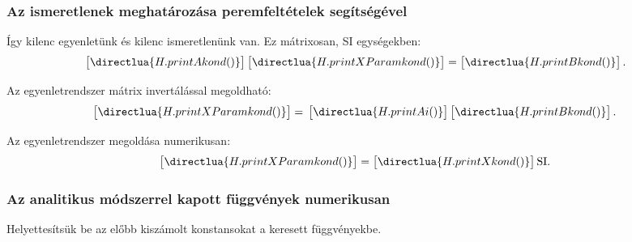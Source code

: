 \subsubsection{Az ismeretlenek meghatározása peremfeltételek segítségével}



Így kilenc egyenletünk és kilenc ismeretlenünk van. Ez mátrixosan,
SI egységekben:
\scriptsize
\begin{equation}
  \bgroup
  \sifigures{2}
  \sisci{}
  \begin{bmatrix}
    \directlua{H.printAkond()}
  \end{bmatrix}
  \egroup
  \begin{bmatrix}
    \directlua{H.printXParamkond()}
  \end{bmatrix}
  =
  \siplaces{3}
  \begin{bmatrix}
    \directlua{H.printBkond()}
  \end{bmatrix}
  \text.
  \label{eq:alma}
\end{equation}
\normalsize

Az egyenletrendszer mátrix invertálással megoldható:
\scriptsize
\begin{equation}
  \begin{bmatrix}
    \directlua{H.printXParamkond()}
  \end{bmatrix}
  =
  \bgroup
  \sifigures{2}
  \sisci{}
  \begin{bmatrix}
    \directlua{H.printAi()}
  \end{bmatrix}
  \egroup
  \siplaces{3}
  \begin{bmatrix}
    \directlua{H.printBkond()}
  \end{bmatrix}
  \label{eq:alma-inverted}
  \text.
\end{equation}
\normalsize

Az egyenletrendszer megoldása numerikusan:
\begin{equation}
  \begin{bmatrix}
    \directlua{H.printXParamkond()}
  \end{bmatrix}
  =
  \sifigures{6}
  \begin{bmatrix}
    \directlua{H.printXkond()}
  \end{bmatrix}
  \mathrm{SI}
  \text.
  \label{eq:alma-sol}
\end{equation}

\subsubsection{Az analitikus módszerrel kapott függvények numerikusan}

Helyettesítsük be az előbb kiszámolt konstansokat a keresett függvényekbe.




